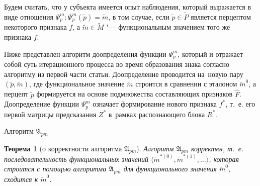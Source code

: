 \documentclass[a4paper, 12pt]{article}
\theoremstyle{plain}
\newtheorem{Theorem}{Теорема}
\begin{document}
		Будем считать, что у субъекта имеется опыт наблюдения, который выражается в виде отношения $\Psi_p^m: \Psi_p^m(\tilde p)=\tilde m$, в том случае, если $\tilde p\in\tilde P$ является перцептом некоторого признака $f$, а $\tilde m\in\tilde M$ "--- функциональным значением того же признака $f$.
		
		Ниже представлен алгоритм доопределения функции $\Psi_p^m$, который и отражает собой суть итерационного процесса во время образования знака согласно алгоритму из первой части статьи. Доопределение проводится на~новую пару $(\tilde p,\tilde m)$, где функциональное значение $\tilde m$ строится в сравнении с эталоном $\tilde m^0$, а перцепт $\tilde p$ формируется на основе подмножества составляющих признаков $\hat F$. Доопределение функции $\Psi_p^m$ означает формирование нового признака $f^*$, т.~е. его первой матрицы предсказания $Z^*$ в~рамках распознающего блока $R^*$.
				
	\begin{algorithm}
		\caption{Алгоритм $\mathfrak{A}_{pm}$}\label{alg:pm}
		\begin{algorithmic}[1]
			
		\end{algorithmic}			
	\end{algorithm}
	
	\begin{Theorem}[о корректности алгоритма $\mathfrak A_{pm}$]
		Алгоритм $\mathfrak A_{pm}$ корректен, т.~е. последовательность функциональных значений $\langle\tilde m^{*(0)},\tilde m^{*(1)},\dots\rangle$, которая строится с помощью алгоритма $\mathfrak A_{pm}$ для функционального значения $\tilde m^0$, сходится к $\tilde m^0$.
	\end{Theorem}
	
\end{document}
